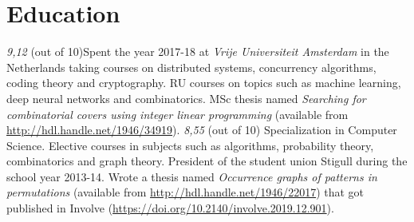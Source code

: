 \documentclass[11pt,a4paper,sans]{moderncv}
\begin{document}
\section{Education}
{\textit{9,12} (out of 10)}{Spent the year 2017-18 at \emph{Vrije Universiteit Amsterdam}
in the Netherlands taking courses on distributed systems, concurrency algorithms, coding
theory and cryptography. RU courses on topics such as machine learning, deep
neural networks and combinatorics. MSc thesis named \emph{Searching for
combinatorial covers using integer linear programming} (available from
\url{http://hdl.handle.net/1946/34919}).}
{\textit{8,55} (out of 10)} {Specialization in Computer Science. Elective courses
in subjects such as algorithms, probability theory, combinatorics and graph theory.
President of the student union Stigull during the school year 2013-14. Wrote a
thesis named \emph{Occurrence graphs of patterns in permutations} (available from
\url{http://hdl.handle.net/1946/22017}) that got published in Involve
(\url{https://doi.org/10.2140/involve.2019.12.901}).}

\end{document}
